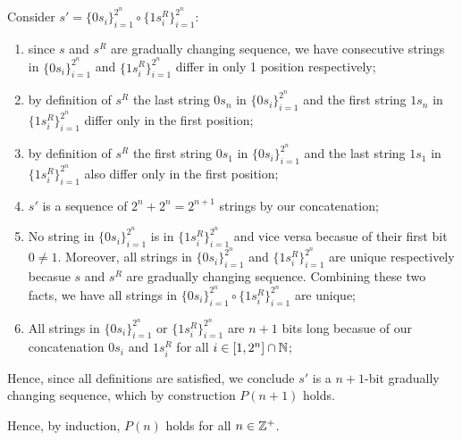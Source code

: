 \documentclass[11pt]{alittlebear}
\begin{document}
{{{{                Consider $s'=\{0 s_i\}_{i=1}^{2^n}\circ\{1 s_i^R\}_{i=1}^{2^n}$: 
                \begin{enumerate}[wide, labelwidth=!, labelindent=0pt]
                    \item since $s$ and $s^R$ are gradually changing sequence, we have consecutive strings in $\{0 s_i\}_{i=1}^{2^n}$ and $\{1 s_i^R\}_{i=1}^{2^n}$ differ in only 1 position respectively;
                    \item by definition of $s^R$ the last string $0 s_n$ in $\{0 s_i\}_{i=1}^{2^n}$  and the first string $1 s_n$ in $\{1 s_i^R\}_{i=1}^{2^n}$ differ only in the first position; 
                    \item by definition of $s^R$ the first string $0 s_1$ in $\{0 s_i\}_{i=1}^{2^n}$  and the last string $1 s_1$ in $\{1 s_i^R\}_{i=1}^{2^n}$ also differ only in the first position;
                    \item $s'$ is a sequence of $2^n+2^n=2^{n+1}$ strings by our concatenation;
                    \item No string in $\{0 s_i\}_{i=1}^{2^n}$ is in $\{1 s_i^R\}_{i=1}^{2^n}$ and vice versa becasue of their first bit $0\neq1$. Moreover, all strings in $\{0 s_i\}_{i=1}^{2^n}$ and $\{1 s_i^R\}_{i=1}^{2^n}$ are unique respectively becasue $s$ and $s^R$ are gradually changing sequence. Combining these two facts, we have all strings in $\{0 s_i\}_{i=1}^{2^n}\circ\{1 s_i^R\}_{i=1}^{2^n}$ are unique;
                    \item All strings in $\{0 s_i\}_{i=1}^{2^n}$ or $\{1 s_i^R\}_{i=1}^{2^n}$ are $n+1$ bits long becasue of our concatenation $0 s_i$ and $1 s_i^R$ for all $i\in[1,2^n]\cap\mathbb{N}$;
                \end{enumerate}

                Hence, since all definitions are satisfied, we conclude $s'$ is a $n+1$-bit gradually changing sequence, which by construction $P(n+1)$ holds.
            }
        }
        Hence, by induction, $P(n)$ holds for all $n\in\mathbb{Z}^+$.
    }
}
\end{document}
